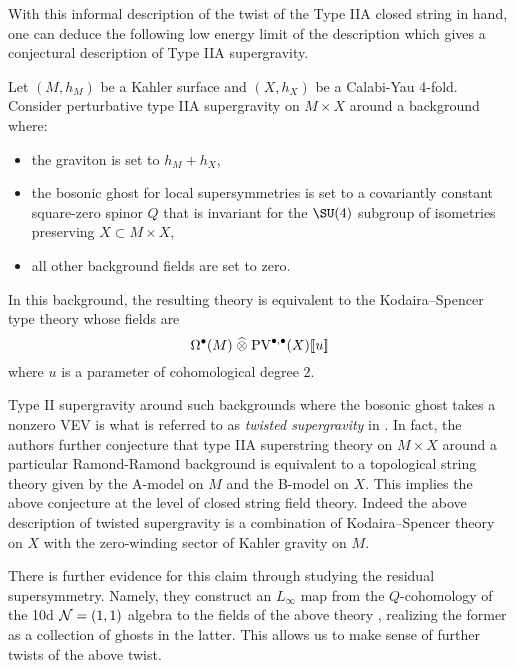 \documentclass[11pt]{amsart}
\def\PV{{\rm PV}}
\begin{document}
With this informal description of the twist of the Type IIA closed string in hand, one can deduce the following low energy limit of the description which gives a conjectural description of Type IIA supergravity.

\begin{conj}
  Let $(M,h_{M})$ be a Kahler surface and $(X, h_{X})$ be a Calabi-Yau 4-fold.
  Consider perturbative type IIA supergravity on $M\times X$ around a background where:
  \begin{itemize}
    \item the graviton is set to $h_{M}+ h_{X}$,
    \item the bosonic ghost for local supersymmetries is set to a covariantly constant square-zero spinor $Q$ that is invariant for the $\SU(4)$ subgroup of isometries preserving $X\subset M\times X$,
    \item all other background fields are set to zero.
  \end{itemize}
  In this background, the resulting theory is equivalent to the Kodaira--Spencer type theory whose fields are
  \[
    \Omega^{\bullet}(M) \; \Hat{\otimes} \; \PV^{\bullet, \bullet}(X)[\![u]\!]
  \]
  where $u$ is a parameter of cohomological degree $2$.
\end{conj}

Type II supergravity around such backgrounds where the bosonic ghost takes a nonzero VEV is what is referred to as {\em twisted supergravity} in \cite{CLsugra}.
In fact, the authors further conjecture that type IIA superstring theory on $M\times X$ around a particular Ramond-Ramond background is equivalent to a topological string theory given by the A-model on $M$ and the B-model on $X$.
This implies the above conjecture at the level of closed string field theory.
Indeed the above description of twisted supergravity is a combination of Kodaira--Spencer theory on $X$ with the zero-winding sector of Kahler gravity on $M$.

There is further evidence for this claim through studying the residual supersymmetry.
Namely, they construct an $L_{\infty}$ map from the $Q$-cohomology of the 10d $\mathcal N = (1,1)$ algebra to the fields of the above theory \cite{CLsugra}, realizing the former as a collection of ghosts in the latter. This allows us to make sense of further twists of the above twist.
\end{document}
